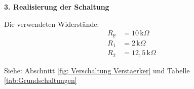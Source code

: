 {    \textbf{3. Realisierung der Schaltung}

    Die verwendeten Widerstände:
    \begin{align*}
        R_\mathrm{F} & = 10\,\mathrm{k}\Omega   \\
        R_1          & = 2\,\mathrm{k}\Omega    \\
        R_2          & = 12,5\,\mathrm{k}\Omega
    \end{align*}


    Siehe: Abschnitt \ref{fig: Verschaltung Verstaerker} und Tabelle \ref{tab:Grundschaltungen}
}